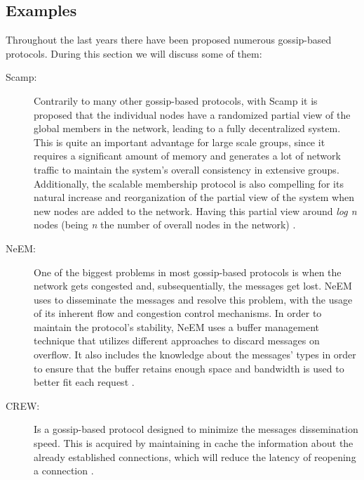 \subsection{Examples}
\label{subsec:gossip_examples}
Throughout the last years there have been proposed numerous gossip-based protocols. During this
section we will discuss some of them:
\begin{description}
      \item[\Gls{Scamp}:] Contrarily to many other gossip-based protocols, with Scamp
            it is proposed that the individual nodes have a randomized partial view of the global
            members in the network, leading to a fully decentralized system. This is quite an
            important advantage for large scale groups, since it requires a significant amount
            of memory and generates a lot of network traffic to maintain the system's overall
            consistency in extensive groups. Additionally, the scalable membership protocol is
            also compelling for its natural increase and reorganization of the partial view of
            the system when new nodes are added to the network. Having this partial view around
            \textit{log n} nodes (being \textit{n} the number of overall nodes in the network)
            \cite{Ganesh2001}.
      \item[\Gls{NeEM}:] One of the biggest problems in most gossip-based protocols is when the
            network gets congested and, subsequentially, the messages get lost. NeEM
            uses  to disseminate the messages and resolve this problem, with the
            usage of its inherent flow and congestion control mechanisms. In order to maintain
            the protocol's stability, NeEM uses a buffer management technique that
            utilizes different approaches to discard messages on overflow. It also includes the
            knowledge about the messages' types in order to ensure that the buffer retains enough
            space and bandwidth is used to better fit each request \cite{Pereira2003}.
      \item[\Gls{CREW}:] Is a gossip-based protocol designed to minimize the messages
            dissemination speed. This is acquired by maintaining in cache the information about
            the already established connections, which will reduce the latency of reopening a
             connection \cite{Deshpande2006}.
\end{description}


